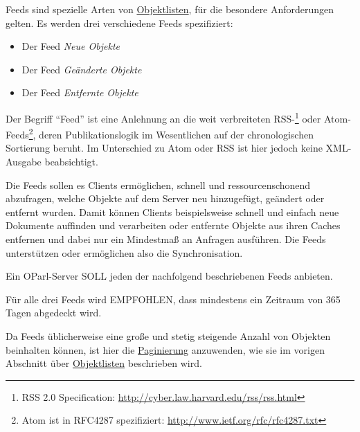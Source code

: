 \documentclass[,a4paper]{article}
\begin{document}

Feeds sind spezielle Arten von \hyperref[objektlisten]{Objektlisten},
für die besondere Anforderungen gelten. Es werden drei verschiedene
Feeds spezifiziert:

\begin{itemize}
\itemsep1pt\parskip0pt
\item
  Der Feed \emph{Neue Objekte}
\item
  Der Feed \emph{Geänderte Objekte}
\item
  Der Feed \emph{Entfernte Objekte}
\end{itemize}

Der Begriff ``Feed'' ist eine Anlehnung an die weit verbreiteten
RSS-\footnote{RSS 2.0 Specification:
  \url{http://cyber.law.harvard.edu/rss/rss.html}} oder
Atom-Feeds\footnote{Atom ist in RFC4287 spezifiziert:
  \url{http://www.ietf.org/rfc/rfc4287.txt}}, deren Publikationslogik im
Wesentlichen auf der chronologischen Sortierung beruht. Im Unterschied
zu Atom oder RSS ist hier jedoch keine XML-Ausgabe beabsichtigt.

Die Feeds sollen es Clients ermöglichen, schnell und ressourcenschonend
abzufragen, welche Objekte auf dem Server neu hinzugefügt, geändert oder
entfernt wurden. Damit können Clients beispielsweise schnell und einfach
neue Dokumente auffinden und verarbeiten oder entfernte Objekte aus
ihren Caches entfernen und dabei nur ein Mindestmaß an Anfragen
ausführen. Die Feeds unterstützen oder ermöglichen also die
Synchronisation.

Ein OParl-Server SOLL jeden der nachfolgend beschriebenen Feeds
anbieten.

Für alle drei Feeds wird EMPFOHLEN, dass mindestens ein Zeitraum von 365
Tagen abgedeckt wird.

Da Feeds üblicherweise eine große und stetig steigende Anzahl von
Objekten beinhalten können, ist hier die
\hyperref[paginierung]{Paginierung} anzuwenden, wie sie im vorigen
Abschnitt über \hyperref[objektlisten]{Objektlisten} beschrieben wird.

\end{document}
